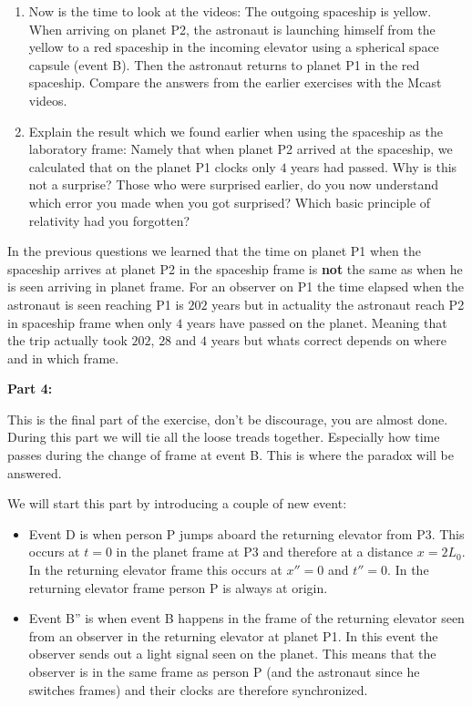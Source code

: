 {\begin{multicols}{2}
\begin{enumerate}
\item Now is the time to look at the videos: The outgoing spaceship is yellow. When arriving on planet P2, the astronaut is launching himself from the yellow to a red spaceship in the incoming elevator using a spherical space capsule (event B). Then the astronaut returns to planet P1 in the red spaceship. Compare the answers from the earlier exercises with the Mcast videos.

\item Explain the result which we found earlier when using the spaceship as the laboratory frame: Namely that when planet P2 arrived at the spaceship, we calculated that on the planet P1 clocks only $4$ years had passed. Why is this not a surprise? Those who were surprised earlier, do you now understand which error you made when you got surprised? Which basic principle of relativity had you forgotten?
\end{enumerate}
In the previous questions we learned that the time on planet P1 when the spaceship arrives at planet P2 in the spaceship frame is \textbf{not} the same as when he is seen arriving in planet frame. For an observer on P1 the time elapsed when the astronaut is seen reaching P1 is $202$ years but in actuality the astronaut reach P2 in spaceship frame when only $4$ years have passed on the planet. Meaning that the trip actually took $202$, $28$ and $4$ years but whats correct depends on where and in which frame.


{\bf Part 4:}

This is the final part of the exercise, don't be discourage, you are almost done. During this part we will tie all the loose treads together. Especially how time passes during the change of frame at event B. This is where the paradox will be answered.

We will start this part by introducing a couple of new event:
\begin{itemize}
\item Event D is when person P jumps aboard the returning elevator from P3. This occurs at $t=0$ in the planet frame at P3 and therefore at a distance $x=2L_0$. In the returning elevator frame this occurs at $x''=0$ and $t''=0$. In the returning elevator frame person P is always at origin.
\item Event B'' is when event B happens in the frame of the returning elevator seen from an observer in the returning elevator at planet P1. In this event the observer sends out a light signal seen on the planet. This means that the observer is in the same frame as person P (and the astronaut since he switches frames) and their clocks are therefore synchronized.
\end{itemize}


\end{multicols}}
